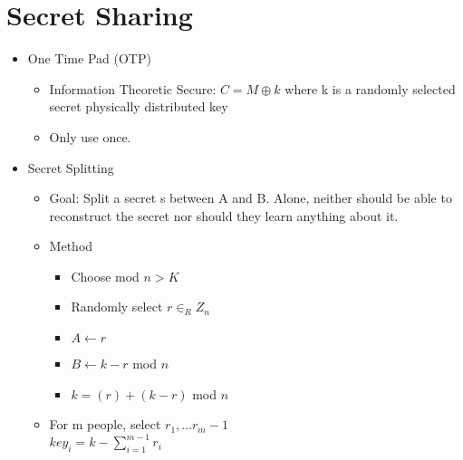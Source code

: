 \section{Secret Sharing}
\begin{itemize}
\item One Time Pad (OTP)
    \begin{itemize}
    \item Information Theoretic Secure: $C = M \oplus k$ where k is a randomly selected secret physically distributed key
    \item Only use once.
    \end{itemize}
\item Secret Splitting
    \begin{itemize}
    \item Goal: Split a secret s between A and B. Alone, neither should be able to reconstruct the secret nor should they learn anything about it.
    \item Method
        \begin{itemize}
        \item Choose mod $n > K$
        \item Randomly select $r \in_R Z_n$
        \item $A \leftarrow r$
        \item $B \leftarrow k-r$ mod $n$
        \item $k = (r) + (k-r)$ mod $n$
        \end{itemize}
    \item For m people, select $r_1, ... r_m-1$
        \\$key_i = k - \sum_{i=1}^{m-1} r_i$
    \end{itemize}
\end{itemize}